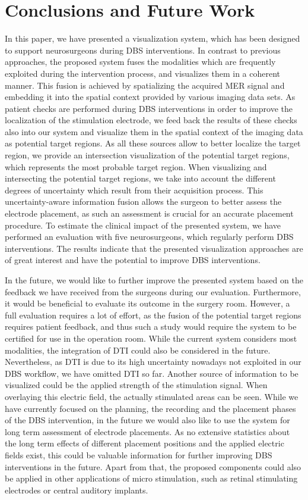 \documentclass[journal]{vgtc}                %
\begin{document}
\section{Conclusions and Future Work}\label{sec:conclusions}
In this paper, we have presented a visualization system, which has been designed to support neurosurgeons during DBS interventions. In contrast to previous approaches, the proposed system fuses the modalities which are frequently exploited during the intervention process, and visualizes them in a coherent manner. This fusion is achieved by spatializing the acquired MER signal and embedding it into the spatial context provided by various imaging data sets. As patient checks are performed during DBS interventions in order to improve the localization of the stimulation electrode, we feed back the results of these checks also into our system and visualize them in the spatial context of the imaging data as potential target regions. As all these sources allow to better localize the target region, we provide an intersection visualization of the potential target regions, which represents the most probable target region. When visualizing and intersecting the potential target regions, we take into account the different degrees of uncertainty which result from their acquisition process. This uncertainty-aware information fusion allows the surgeon to better assess the electrode placement, as such an assessment is crucial for an accurate placement procedure. To estimate the clinical impact of the presented system, we have performed an evaluation with five neurosurgeons, which regularly perform DBS interventions. The results indicate that the presented visualization approaches are of great interest and have the potential to improve DBS interventions.

In the future, we would like to further improve the presented system based on the feedback we have received from the surgeons during our evaluation. Furthermore, it would be beneficial to evaluate its outcome in the surgery room. However, a full evaluation requires a lot of effort, as the fusion of the potential target regions requires patient feedback, and thus such a study would require the system to be certified for use in the operation room. While the current system considers most modalities, the integration of DTI could also be considered in the future. Nevertheless, as DTI is due to its high uncertainty nowadays not exploited in our DBS workflow, we have omitted DTI so far. Another source of information to be visualized could be the applied strength of the stimulation signal. When overlaying this electric field, the actually stimulated areas can be seen. While we have currently focused on the planning, the recording and the placement phases of the DBS intervention, in the future we would also like to use the system for long term assessment of electrode placements. As no extensive statistics about the long term effects of different placement positions and the applied electric fields exist, this could be valuable information for further improving DBS interventions in the future. Apart from that, the proposed components could also be applied in other applications of micro stimulation, such as retinal stimulating electrodes or central auditory implants.
\end{document}
